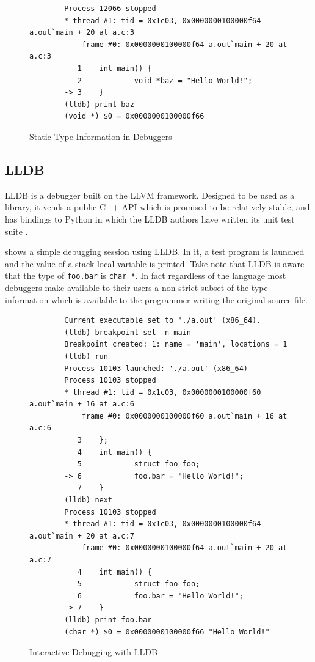 \documentclass{report}
\begin{document}
\begin{figure}[p]
	\begin{verbatim}
		Process 12066 stopped
		* thread #1: tid = 0x1c03, 0x0000000100000f64 a.out`main + 20 at a.c:3
		    frame #0: 0x0000000100000f64 a.out`main + 20 at a.c:3
		   1    int main() {
		   2            void *baz = "Hello World!";
		-> 3    }
		(lldb) print baz
		(void *) $0 = 0x0000000100000f66
	\end{verbatim}
	\caption{Static Type Information in Debuggers}
	\label{fig:static_introspection}
\end{figure}

\subsection{LLDB}
\label{subsec:lldb}
LLDB \autocite{lldb} is a debugger built on the LLVM \autocite{llvm} framework.
Designed to be used as a library, it vends a public C++ API which is
promised to be relatively stable, and has bindings to Python in which the LLDB
authors have written its unit test suite \autocite{lldb-python-api}.

 shows a simple debugging session using LLDB. In it, a test
program is launched and the value of a stack-local variable is printed. Take
note that LLDB is aware that the type of \lstinline|foo.bar| is
\lstinline|char *|. In fact regardless of the language most debuggers make
available to their users a non-strict subset of the type information which is
available to the programmer writing the original source file.

\begin{figure}[p]
	\begin{verbatim}
		Current executable set to './a.out' (x86_64).
		(lldb) breakpoint set -n main
		Breakpoint created: 1: name = 'main', locations = 1
		(lldb) run
		Process 10103 launched: './a.out' (x86_64)
		Process 10103 stopped
		* thread #1: tid = 0x1c03, 0x0000000100000f60 a.out`main + 16 at a.c:6
		    frame #0: 0x0000000100000f60 a.out`main + 16 at a.c:6
		   3    };
		   4    int main() {
		   5            struct foo foo;
		-> 6            foo.bar = "Hello World!";
		   7    }
		(lldb) next
		Process 10103 stopped
		* thread #1: tid = 0x1c03, 0x0000000100000f64 a.out`main + 20 at a.c:7
		    frame #0: 0x0000000100000f64 a.out`main + 20 at a.c:7
		   4    int main() {
		   5            struct foo foo;
		   6            foo.bar = "Hello World!";
		-> 7    }
		(lldb) print foo.bar
		(char *) $0 = 0x0000000100000f66 "Hello World!"
	\end{verbatim}
	\caption{Interactive Debugging with LLDB}
	\label{fig:debugging}
\end{figure}
\end{document}
